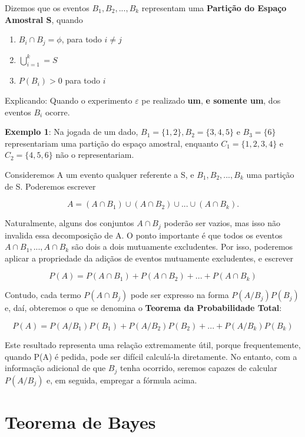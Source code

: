 Dizemos que os eventos $B_{1},B_{2},...,B_{k}$ representam uma
\textbf{Partição do Espaço Amostral S}, quando


\begin{enumerate}
    \item $B_{i} \cap B_{j}=\phi$, para todo $i\neq j$
    \item $\bigcup^{k}_{i=1}=S$
    \item $P(B_{i})>0$ para todo $i$
\end{enumerate}

Explicando: Quando o experimento $\varepsilon$ pe realizado
\textbf{um}, \textbf{e somente um}, dos eventos $B_{i}$
ocorre.\vskip0.3cm

\textbf{Exemplo 1}: Na jogada de um dado,
$B_{1}=\{1,2\},B_{2}=\{3,4,5 \}$ e $B_{3}=\{6\}$ representariam
uma partição do espaço amostral, enquanto $C_{1}=\{1,2,3,4\}$ e
$C_{2}=\{4,5,6 \}$ não o representariam.\vskip0.3cm

Consideremos A um evento qualquer referente a S, e
$B_{1},B_{2},...,B_{k}$ uma partição de S. Poderemos escrever

$$
A = (A \cap B_{1}) \cup (A \cap B_{2}) \cup ... \cup (A \cap
B_{k}).
$$

Naturalmente, alguns dos conjuntos $A \cap B_{j}$ poderão ser
vazios, mas isso não invalida essa decomposição de A. O ponto
importante é que todos os eventos $A \cap B_{1},...,A \cap B_{k}$
são dois a dois mutuamente excludentes. Por isso, poderemos
aplicar a propriedade da adiçãos de eventos mutuamente
excludentes, e escrever


$$
P(A)=P(A\cap B_{1})+P(A\cap B_{2})+...+P(A\cap B_{k})
$$

Contudo, cada termo $P(A\cap B_{j})$ pode ser expresso na forma
$P(A/B_{j})P(B_{j})$ e, daí, obteremos o que se denomina o
\textbf{Teorema da Probabilidade Total}:

\begin{equation}\label{}
P(A)=P(A/B_{1})P(B_{1})+P(A/B_{2})P(B_{2})+...+P(A/B_{k})P(B_{k})
\end{equation}

Este resultado representa uma relação extremamente útil, porque
frequentemente, quando P(A) é pedida, pode ser difícil calculá-la
diretamente. No entanto, com a informação adicional de que $B_{j}$
tenha ocorrido, seremos capazes de calcular $P(A/B_{j})$ e, em
seguida, empregar a fórmula acima.



\section{Teorema de Bayes}

